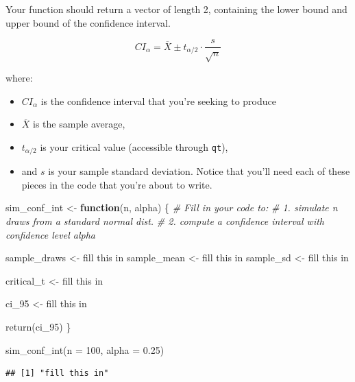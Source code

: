 \documentclass[
]{book}
\newenvironment{Shaded}{\begin{snugshade}}{\end{snugshade}}
\newcommand{\AttributeTok}[1]{\textcolor[rgb]{0.77,0.63,0.00}{#1}}
\newcommand{\CommentTok}[1]{\textcolor[rgb]{0.56,0.35,0.01}{\textit{#1}}}
\newcommand{\ControlFlowTok}[1]{\textcolor[rgb]{0.13,0.29,0.53}{\textbf{#1}}}
\newcommand{\DecValTok}[1]{\textcolor[rgb]{0.00,0.00,0.81}{#1}}
\newcommand{\FloatTok}[1]{\textcolor[rgb]{0.00,0.00,0.81}{#1}}
\newcommand{\FunctionTok}[1]{\textcolor[rgb]{0.00,0.00,0.00}{#1}}
\newcommand{\NormalTok}[1]{#1}
\newcommand{\OtherTok}[1]{\textcolor[rgb]{0.56,0.35,0.01}{#1}}
\newcommand{\StringTok}[1]{\textcolor[rgb]{0.31,0.60,0.02}{#1}}
\providecommand{\tightlist}{%
  \setlength{\itemsep}{0pt}\setlength{\parskip}{0pt}}
\theoremstyle{definition}
\theoremstyle{definition}
\theoremstyle{definition}
\theoremstyle{definition}
\theoremstyle{remark}
\begin{document}
Your function should return a vector of length 2, containing the lower bound and upper bound of the confidence interval.

\[
CI_{\alpha} = \overline{X} \pm t_{\alpha/2} \cdot \frac{s}{\sqrt{n}}
\]

where:

\begin{itemize}
\tightlist
\item
  \(CI_\alpha\) is the confidence interval that you're seeking to produce
\item
  \(\overline{X}\) is the sample average,\\
\item
  \(t_{\alpha/2}\) is your critical value (accessible through \texttt{qt}),
\item
  and \(s\) is your sample standard deviation. Notice that you'll need each of these pieces in the code that you're about to write.
\end{itemize}

\begin{Shaded}
\begin{Highlighting}[]
\NormalTok{sim\_conf\_int }\OtherTok{\textless{}{-}} \ControlFlowTok{function}\NormalTok{(n, alpha) \{}
  \CommentTok{\# Fill in your code to: }
  \CommentTok{\# 1. simulate n draws from a standard normal dist.}
  \CommentTok{\# 2. compute a confidence interval with confidence level alpha}
  
\NormalTok{  sample\_draws }\OtherTok{\textless{}{-}} \StringTok{\textquotesingle{}fill this in\textquotesingle{}}
\NormalTok{  sample\_mean  }\OtherTok{\textless{}{-}} \StringTok{\textquotesingle{}fill this in\textquotesingle{}}
\NormalTok{  sample\_sd    }\OtherTok{\textless{}{-}} \StringTok{\textquotesingle{}fill this in\textquotesingle{}}
  
\NormalTok{  critical\_t }\OtherTok{\textless{}{-}} \StringTok{\textquotesingle{}fill this in\textquotesingle{}}
  
\NormalTok{  ci\_95 }\OtherTok{\textless{}{-}} \StringTok{\textquotesingle{}fill this in\textquotesingle{}}
  
  \FunctionTok{return}\NormalTok{(ci\_95)  }
\NormalTok{\}}

\FunctionTok{sim\_conf\_int}\NormalTok{(}\AttributeTok{n =} \DecValTok{100}\NormalTok{, }\AttributeTok{alpha =} \FloatTok{0.25}\NormalTok{)}
\end{Highlighting}
\end{Shaded}

\begin{verbatim}
## [1] "fill this in"
\end{verbatim}
\end{document}
